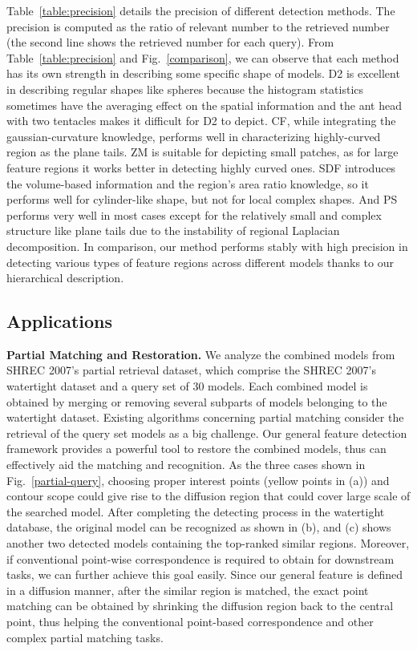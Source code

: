 Table~\ref{table:precision}
details the precision of different detection methods. The precision is
computed as the ratio of relevant number to the retrieved number (the
second line shows the retrieved number for each query). From
Table~\ref{table:precision} and Fig.~\ref{comparison}, we can observe
that each method has its own strength in describing some specific
shape of models. D2 is excellent in describing regular shapes like
spheres because the histogram statistics sometimes have the averaging
effect on the spatial information and the ant head with two tentacles
makes it difficult for D2 to depict. CF, while integrating the
gaussian-curvature knowledge, performs well in characterizing
highly-curved region as the plane tails. ZM is
suitable for depicting small patches, as for large feature regions
it works better in detecting highly curved ones. SDF introduces the
volume-based information and the region's area ratio knowledge, so it
performs well for cylinder-like shape, but not for local complex
shapes. And PS performs very well in most cases except for the
relatively small and complex structure like plane tails due to the
instability of regional Laplacian decomposition. In comparison, our
method performs stably with high precision in detecting various types
of feature regions across different models thanks to our hierarchical
description.

\subsection{Applications}

\textbf{Partial Matching and Restoration.}
We analyze the combined models from SHREC 2007's partial retrieval dataset,
which comprise the SHREC 2007's watertight dataset and a query set of 30 models.
Each combined model is obtained by merging or removing several subparts of
models belonging to the watertight dataset. Existing algorithms
concerning partial matching consider the retrieval of the query
set models as a big challenge. Our general feature
detection framework provides a powerful tool to restore the combined
models, thus can effectively aid the matching and recognition.
As the three cases shown in Fig.~\ref{partial-query}, choosing proper
interest points (yellow points in (a)) and contour scope could give rise
to the diffusion region that could cover large scale of the searched model.
After completing the detecting process in the watertight database, the
original model can be recognized as shown in (b), and (c) shows another
two detected models containing the top-ranked similar regions. Moreover,
if conventional point-wise correspondence is required to obtain for
downstream tasks, we can further achieve this goal easily. Since our
general feature is defined in a diffusion manner, after the similar
region is matched, the exact point matching can be obtained by shrinking
the diffusion region back to the central point, thus helping the
conventional point-based correspondence and other complex
partial matching tasks.

